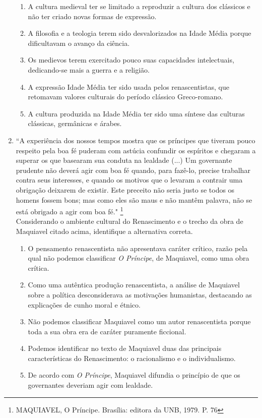 \documentclass[10pt,a4paper]{article}
\begin{document}
\begin{multicols}{2}
\begin{enumerate}
		\begin{enumerate}
		\item A cultura medieval ter se limitado a reproduzir a cultura dos cl\'assicos e n\~ao ter criado novas formas de express\~ao. 
		\item A filosofia e a teologia terem sido desvalorizados na Idade M\'edia porque dificultavam o avan\c{c}o da ci\^encia.  
		\item Os medievos terem exercitado pouco suas capacidades intelectuais, dedicando-se mais a guerra e a religi\~ao. 
		\item A express\~ao Idade M\'edia ter sido usada pelos renascentistas, que retomavam valores culturais do per\'iodo cl\'assico Greco-romano.
		\item A cultura produzida na Idade M\'edia ter sido uma s\'intese das culturas cl\'assicas, germânicas e \'arabes. 
		\end{enumerate}

	\item ``A experi\^encia dos nossos tempos mostra que os pr\'incipes que tiveram pouco respeito pela boa f\'e puderam com ast\'ucia confundir os esp\'iritos e chegaram a superar os que basearam sua conduta na lealdade (...) Um governante prudente n\~ao dever\'a agir com boa f\'e quando, para faz\^e-lo, precise trabalhar contra seus interesses, e quando os motivos que o levaram a contrair uma obriga\c{c}\~ao deixarem de existir. Este preceito n\~ao seria justo se todos os homens fossem bons; mas como eles s\~ao maus e n\~ao mant\^em palavra, n\~ao se est\'a obrigado a agir com boa f\'e." \footnote{MAQUIAVEL, O Pr\'incipe. Bras\'ilia: editora da UNB, 1979. P. 76} \\

	Considerando o ambiente cultural do Renascimento e o trecho da obra de Maquiavel citado acima, identifique a alternativa correta.

		\begin{enumerate}
		\item  O pensamento renascentista n\~ao apresentava car\'ater cr\'itico, raz\~ao pela qual n\~ao podemos classificar \emph{O Pr\'incipe}, de Maquiavel, como uma obra cr\'itica.
		\item Como uma aut\^entica produ\c{c}\~ao renascentista, a an\'alise de Maquiavel sobre a pol\'itica desconsiderava as motiva\c{c}\~oes humanistas, destacando as explica\c{c}\~oes de cunho moral e \'etnico. 
		\item N\~ao podemos classificar Maquiavel como um autor renascentista porque toda a sua obra era de car\'ater puramente ficcional. 
		\item Podemos identificar no texto de Maquiavel duas das principais caracter\'isticas do Renascimento: o racionalismo e o individualismo.
		\item De acordo com \emph{O Pr\'incipe}, Maquiavel difundia o princ\'ipio de que os governantes deveriam agir com lealdade. 
		\end{enumerate}


\end{enumerate}
\end{multicols}
\end{document}
